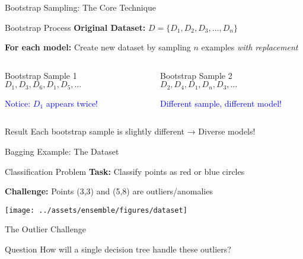 \documentclass[10pt]{beamer}
\newcommand{\fitpic}[1]{\begin{adjustbox}{max width=\linewidth, max totalheight=0.78\textheight}#1\end{adjustbox}}
\begin{document}
\begin{frame}{Bootstrap Sampling: The Core Technique}
\begin{examplebox}{Bootstrap Process}
\textbf{Original Dataset:} $D = \{D_1, D_2, D_3, \ldots, D_n\}$

\textbf{For each model:} Create new dataset by sampling $n$ examples \emph{with replacement}
\end{examplebox}

\begin{columns}
\begin{column}{0.5\textwidth}
\begin{definitionbox}{Bootstrap Sample 1}
$D_1, D_3, D_6, D_1, D_5, \ldots$

\textcolor{blue}{Notice: $D_1$ appears twice!}
\end{definitionbox}
\end{column}

\begin{column}{0.5\textwidth}
\begin{definitionbox}{Bootstrap Sample 2}
$D_2, D_4, D_1, D_n, D_3, \ldots$

\textcolor{blue}{Different sample, different model!}
\end{definitionbox}
\end{column}
\end{columns}

\begin{keypointsbox}{Result}
Each bootstrap sample is slightly different → Diverse models!
\end{keypointsbox}
\end{frame}

\begin{frame}{Bagging Example: The Dataset}
\begin{alertbox}{Classification Problem}
\textbf{Task:} Classify points as red or blue circles

\textbf{Challenge:} Points (3,3) and (5,8) are outliers/anomalies
\end{alertbox}

  \begin{center}
  \fitpic{\texttt{[image: ../assets/ensemble/figures/dataset]}}
  \end{center}
\end{frame}

\begin{frame}{The Outlier Challenge}
\begin{keypointsbox}{Question}
How will a single decision tree handle these outliers?
\end{keypointsbox}
\end{frame}
\end{document}
